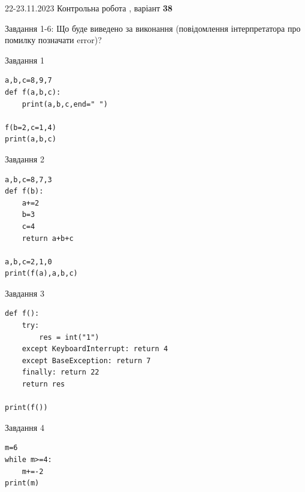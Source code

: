 \documentclass[12pt, ukrainian]{article}
\begin{document}
{{22-23.11.2023 Контрольна робота , варіант  \No \textbf { 38 }\par}}
{

Завдання 1-6: Що буде виведено за виконання (повідомлення інтерпретатора про помилку позначати error)?


\begin{minipage}[t]{9.7cm}                
{\begin{center}Завдання {1}\end{center}}
\begin{verbatim}
a,b,c=8,9,7
def f(a,b,c):
    print(a,b,c,end=" ")

f(b=2,c=1,4)
print(a,b,c)
\end{verbatim}     
\end{minipage}
\vline \hspace{8mm}
\begin{minipage}[t]{8.0cm}                
{\begin{center}Завдання {2}\end{center}}
\begin{verbatim}
a,b,c=8,7,3
def f(b):
    a+=2
    b=3
    c=4
    return a+b+c

a,b,c=2,1,0
print(f(a),a,b,c)
\end{verbatim}     
\end{minipage}

\vspace{15mm}
\begin{minipage}[t]{9.7cm}                
{\begin{center}Завдання {3}\end{center}}
\begin{verbatim}
def f():
    try:
        res = int("1")
    except KeyboardInterrupt: return 4
    except BaseException: return 7
    finally: return 22
    return res

print(f())
\end{verbatim}     
\end{minipage}
\vline \hspace{8mm}
\begin{minipage}[t]{8.0cm}                
{\begin{center}Завдання {4}\end{center}}
\begin{verbatim}
m=6
while m>=4:
    m+=-2
print(m)
\end{verbatim}     
\end{minipage}

}
\end{document}
